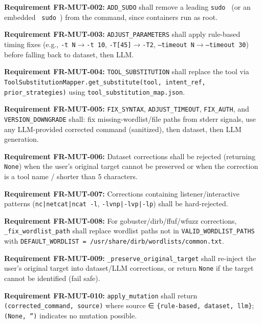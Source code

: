 \documentclass[10pt,journal,onecolumn]{IEEEtran}
\newcommand{\reqid}[1]{\textbf{#1}}
\begin{document}
\reqid{Requirement FR-MUT-002:} \texttt{ADD\_SUDO} shall remove a leading \texttt{sudo } (or an embedded \texttt{ sudo }) from the command, since containers run as root.

\reqid{Requirement FR-MUT-003:} \texttt{ADJUST\_PARAMETERS} shall apply rule-based timing fixes (e.g., \texttt{-t N}$\rightarrow$\texttt{-t 10}, \texttt{-T[45]}$\rightarrow$\texttt{-T2}, \texttt{--timeout N}$\rightarrow$\texttt{--timeout 30}) before falling back to dataset, then LLM.

\reqid{Requirement FR-MUT-004:} \texttt{TOOL\_SUBSTITUTION} shall replace the tool via \texttt{ToolSubstitutionMapper.\allowbreak get\_\allowbreak substitute(tool, intent\_\allowbreak ref, prior\_\allowbreak strategies)} using \texttt{tool\_\allowbreak substitution\_\allowbreak map.\allowbreak json}.

\reqid{Requirement FR-MUT-005:} \texttt{FIX\_SYNTAX}, \texttt{ADJUST\_TIMEOUT}, \texttt{FIX\_AUTH}, and \texttt{VERSION\_DOWNGRADE} shall: fix missing-wordlist/file paths from stderr signals, use any LLM-provided corrected command (sanitized), then dataset, then LLM generation.

\reqid{Requirement FR-MUT-006:} Dataset corrections shall be rejected (returning \texttt{None}) when the user's original target cannot be preserved or when the correction is a tool name / shorter than 5 characters.

\reqid{Requirement FR-MUT-007:} Corrections containing listener/interactive patterns (\texttt{nc|netcat|ncat -l}, \texttt{-lvnp|-lvp|-lp}) shall be hard-rejected.

\reqid{Requirement FR-MUT-008:} For gobuster/dirb/ffuf/wfuzz corrections, \texttt{\_fix\_wordlist\_path} shall replace wordlist paths not in \texttt{VALID\_WORDLIST\_PATHS} with \texttt{DEFAULT\_\allowbreak WORDLIST = /\allowbreak usr/\allowbreak share/\allowbreak dirb/\allowbreak wordlists/\allowbreak common.\allowbreak txt}.

\reqid{Requirement FR-MUT-009:} \texttt{\_\allowbreak preserve\_\allowbreak original\_\allowbreak target} shall re-inject the user's original target into dataset/LLM corrections, or return \texttt{None} if the target cannot be identified (fail safe).

\reqid{Requirement FR-MUT-010:} \texttt{apply\_mutation} shall return \texttt{(corrected\_\allowbreak command, source)} where source ∈ \texttt{\{rule-\allowbreak based, dataset, llm\}}; \texttt{(None, '')} indicates no mutation possible.
\end{document}
